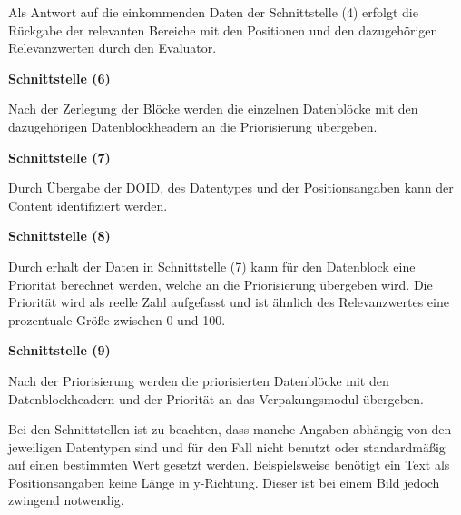 Als Antwort auf die einkommenden Daten der Schnittstelle (4)
erfolgt die Rückgabe der relevanten Bereiche mit den Positionen und den
dazugehörigen Relevanzwerten durch den Evaluator.

\textbf{Schnittstelle (6)} 

Nach der Zerlegung der Blöcke werden die einzelnen
Datenblöcke mit den dazugehörigen Datenblockheadern an die
Priorisierung übergeben.

\textbf{Schnittstelle (7)} 

Durch Übergabe der \gls{DOID}, des Datentypes und der Positionsangaben kann der
Content identifiziert werden.

\textbf{Schnittstelle (8)}

Durch erhalt der Daten in Schnittstelle (7) kann für
den Datenblock eine Priorität berechnet werden, welche an die Priorisierung übergeben
wird. Die Priorität wird als reelle Zahl aufgefasst und ist ähnlich des
Relevanzwertes eine prozentuale Größe zwischen 0 und 100.

\textbf{Schnittstelle (9)} 

Nach der Priorisierung werden die priorisierten Datenblöcke mit den
Datenblockheadern und der Priorität an das Verpakungsmodul übergeben.

Bei den Schnittstellen ist zu beachten, dass manche Angaben abhängig von den
jeweiligen Datentypen sind und für den Fall nicht benutzt oder
standardmäßig auf einen bestimmten Wert gesetzt werden. Beispielsweise benötigt
ein Text als Positionsangaben keine Länge in y-Richtung. Dieser ist bei einem
Bild jedoch zwingend notwendig.
